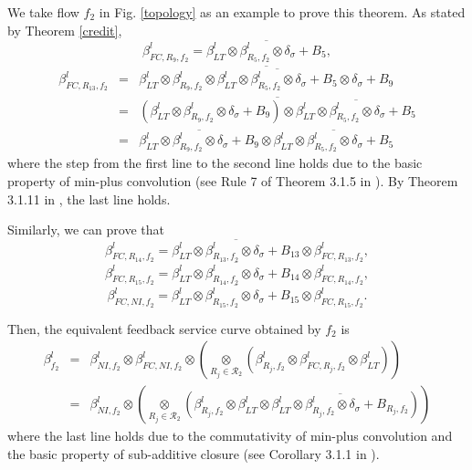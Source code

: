 \documentclass[preprint]{elsarticle}
\begin{document}
\begin{pf}
We take flow $f_2$ in Fig. \ref{topology} as an example to prove this theorem. As stated by Theorem \ref{credit}, $$\beta_{FC,R_9,f_2}^l=\overline{\beta^l_{LT}\otimes\beta_{R_5,f_2}^l\otimes\delta_\sigma+B_5},$$
\begin{eqnarray*}
\beta_{FC,R_{13},f_2}^l&=&\overline{\beta^l_{LT}\otimes\beta^l_{R_9,f_2}\otimes\overline{\beta^l_{LT}\otimes\beta^l_{R_5,f_2}\otimes\delta_\sigma+B_5}\otimes\delta_\sigma+B_9}\label{eq1}\\
&=&\overline{(\beta^l_{LT}\otimes\beta^l_{R_9,f_2}\otimes\delta_\sigma+B_9)\otimes\overline{\beta^l_{LT}\otimes\beta^l_{R_5,f_2}\otimes\delta_\sigma+B_5}}\label{eq2}\\
&=&\overline{\beta^l_{LT}\otimes\beta^l_{R_9,f_2}\otimes\delta_\sigma+B_9}\otimes\overline{\beta^l_{LT}\otimes\beta^l_{R_5,f_2}\otimes\delta_\sigma+B_5}\label{eq3}
\end{eqnarray*}
where the step from the first line to the second line holds due to the basic property of min-plus convolution (see Rule 7 of Theorem 3.1.5 in \cite{Boudec2001Network}). By Theorem 3.1.11 in \cite{Boudec2001Network}, the last line holds.

Similarly, we can prove that
$$\beta_{FC,R_{14},f_2}^l=\overline{\beta^l_{LT}\otimes\beta^l_{R_{13},f_2}\otimes\delta_\sigma+B_{13}}\otimes\beta_{FC,R_{13},f_2}^l,$$
$$\beta_{FC,R_{15},f_2}^l=\overline{\beta^l_{LT}\otimes\beta^l_{R_{14},f_2}\otimes\delta_\sigma+B_{14}}\otimes\beta_{FC,R_{14},f_2}^l,$$
$$\beta_{FC,NI,f_2}^l=\overline{\beta^l_{LT}\otimes\beta^l_{R_{15},f_2}\otimes\delta_\sigma+B_{15}}\otimes\beta_{FC,R_{15},f_2}^l.$$

Then, the equivalent feedback service curve obtained by $f_2$ is
\begin{eqnarray*}
\beta_{f_2}^l&=&\beta_{NI,f_2}^l\otimes\beta_{FC,NI,f_2}^l\otimes(\underset{R_j\in\mathcal{R}_2}{\otimes}(\beta^l_{R_j,f_2}\otimes\beta^l_{FC,R_j,f_2}\otimes\beta_{LT}^l))\\
&=& \beta_{NI,f_2}^l\otimes(\underset{R_j\in\mathcal{R}_2}{\otimes}(\beta^l_{R_j,f_2}\otimes\beta_{LT}^l\otimes\overline{\beta^l_{LT}\otimes\beta^l_{R_{j},f_2}\otimes\delta_\sigma+B_{R_j,f_2}}))
\end{eqnarray*}
where the last line holds due to the commutativity of min-plus convolution and the basic property of sub-additive closure (see Corollary 3.1.1 in \cite{Boudec2001Network}).


\end{pf}
\end{document}

